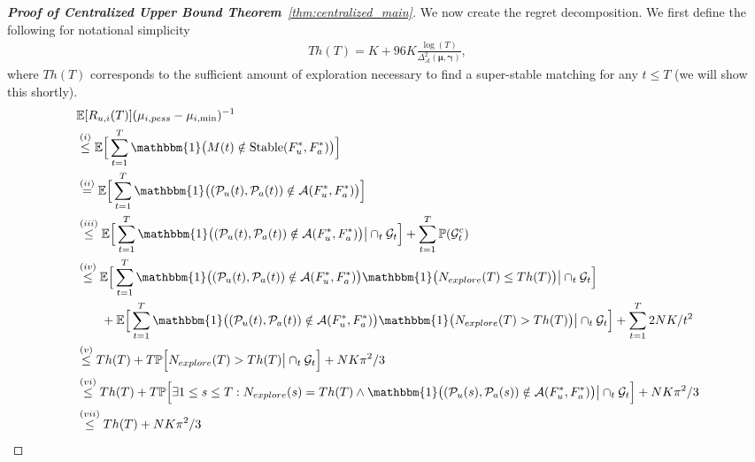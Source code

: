 \documentclass{article}
\begin{document}
\begin{proof}[\textbf{Proof of Centralized Upper Bound Theorem}~\ref{thm:centralized_main}]
We now create the regret decomposition. We first define the following for notational simplicity
\begin{align*}
Th(T) = K + 96 K \frac{\log(T)}{\Delta^2_{\mathcal{A}}(\boldsymbol{\mu}, \boldsymbol{\gamma})}, 
\end{align*}
where $Th(T)$ corresponds to the sufficient amount of exploration necessary to find a super-stable matching for any $t \leq T$ (we will show this shortly).
\begin{align*}
   &\mathbb{E}[R_{u,i}(T)] (\mu_{i,pess} - \mu_{i, \min})^{-1} \\
   &\overset{(i)}{\leq} \mathbb{E}\Big[\sum_{t=1}^{T}  \mathbbm{1}\big( M(t) \notin \mathrm{Stable}(F^*_u, F^*_a)\big)\Big] \\
   &\overset{(ii)}{=} \mathbb{E}\Big[\sum_{t=1}^{T}  \mathbbm{1}\big((\mathcal{P}_{u}(t), \mathcal{P}_{a}(t)) \notin \mathcal{A}(F^*_u, F^*_a)\big) \Big] \\
   &\overset{(iii)}{\leq} \mathbb{E}\Big[\sum_{t=1}^{T}  \mathbbm{1}\big((\mathcal{P}_{u}(t), \mathcal{P}_{a}(t)) \notin \mathcal{A}(F^*_u, F^*_a)\big) \big\vert \cap_t\mathcal{G}_t \Big] + \sum_{t=1}^{T}\mathbb{P}(\mathcal{G}^c_t)\\
   &\overset{(iv)}{\leq} \mathbb{E}\Big[\sum_{t=1}^{T}  \mathbbm{1}\big((\mathcal{P}_{u}(t), \mathcal{P}_{a}(t)) \notin \mathcal{A}(F^*_u, F^*_a)\big) \mathbbm{1} \big(N_{explore}(T) \leq Th(T)\big) \big\vert \cap_t\mathcal{G}_t  \Big] \\
   & \quad\quad + \mathbb{E}\Big[\sum_{t=1}^{T}  \mathbbm{1}\big((\mathcal{P}_{u}(t), \mathcal{P}_{a}(t)) \notin \mathcal{A}(F^*_u, F^*_a)\big) \mathbbm{1} \big(N_{explore}(T) > Th(T)\big) \big\vert \cap_t\mathcal{G}_t  \Big] 
   + \sum_{t=1}^{T} 2 NK / t^2\\
   &\overset{(v)}{\leq} Th(T) + T\mathbb{P}\Big[ N_{explore}(T) > Th(T) \big\vert \cap_t\mathcal{G}_t \Big]  + N K \pi^2 /3\\
   &\overset{(vi)}{\leq} Th(T) + T\mathbb{P}\Big[ \exists 1 \leq s \leq T :  N_{explore}(s) = Th(T) \wedge  \mathbbm{1}\big((\mathcal{P}_{u}(s), \mathcal{P}_{a}(s)) \notin \mathcal{A}(F^*_u, F^*_a)\big) \big\vert \cap_t\mathcal{G}_t \Big]  +  N K \pi^2 /3\\
   &\overset{(vii)}{\leq} Th(T) + N K \pi^2 /3
\end{align*}

\end{proof}
\end{document}
